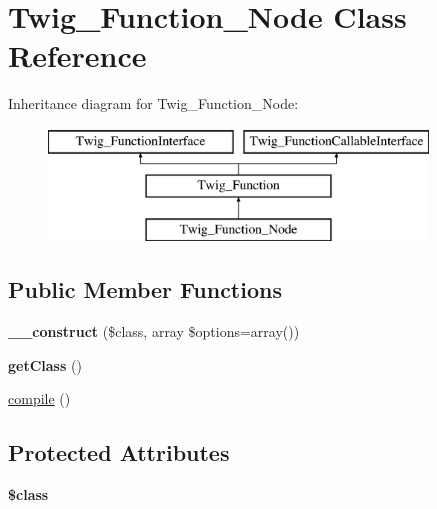 \hypertarget{class_twig___function___node}{}\section{Twig\+\_\+\+Function\+\_\+\+Node Class Reference}
\label{class_twig___function___node}
Inheritance diagram for Twig\+\_\+\+Function\+\_\+\+Node\+:\begin{figure}[H]
\begin{center}
\leavevmode
\includegraphics[height=3.000000cm]{class_twig___function___node}
\end{center}
\end{figure}
\subsection*{Public Member Functions}
\begin{DoxyCompactItemize}
\item 
\hypertarget{class_twig___function___node_ad54af67e0f4e88a0c80d60b51380a48e}{}{\bfseries \+\_\+\+\_\+construct} (\$class, array \$options=array())\label{class_twig___function___node_ad54af67e0f4e88a0c80d60b51380a48e}

\item 
\hypertarget{class_twig___function___node_a23ecbde357f7f6bde5a50f876334a74d}{}{\bfseries get\+Class} ()\label{class_twig___function___node_a23ecbde357f7f6bde5a50f876334a74d}

\item 
\hyperlink{class_twig___function___node_a3815e7c2e73f00c2ebffcf5b90eef3b1}{compile} ()
\end{DoxyCompactItemize}
\subsection*{Protected Attributes}
\begin{DoxyCompactItemize}
\item 
\hypertarget{class_twig___function___node_a252ba022809910ea710a068fc1bab657}{}{\bfseries \$class}\label{class_twig___function___node_a252ba022809910ea710a068fc1bab657}

\end{DoxyCompactItemize}


